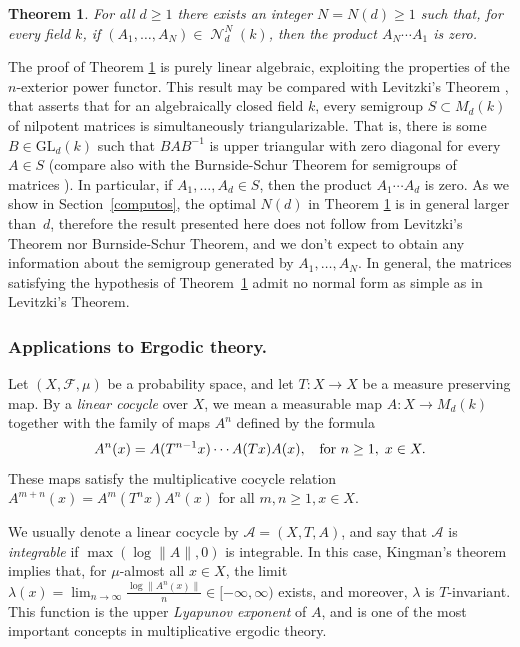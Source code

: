 \documentclass[JEP,XML,SOM,Unicode,NoEqCountersInSection]{cedram}
\let\mathcal\mathscr
\theoremstyle{plain}
\newtheorem{teo}{Theorem}[section]
\theoremstyle{definition}
\newcommand{\ccl}[3]{#1^{#2}(#3)}
\DeclareMathOperator{\Nil}{\mathcal{N}}
\begin{document}
\begin{teo}\label{nilpotentes} For all $d\geq 1$ there exists an integer $N=N(d)\geq 1$ such that, for every field $k$, if $(A_1,\dots,A_N) \in \Nil_{d}^{N}(k)$, then the product $A_{N}\cdots A_{1}$ is zero.
\end{teo}
The proof of Theorem \ref{nilpotentes} is purely linear algebraic, exploiting the properties of the $n$-exterior power functor. This result may be compared with Levitzki's Theorem \cite[Th.\,2.1.7]{raro}, that asserts that for an algebraically closed field $k$, every semigroup $S\subset M_{d}(k)$ of nilpotent matrices is simultaneously triangularizable. That is, there is some $B\in \mathrm{GL}_{d}(k)$ such that $BAB^{-1}$ is upper triangular with zero diagonal for every $A \in S$ (compare also with the Burnside-Schur Theorem for semigroups of matrices \cite{mcnaugh}). In particular, if $A_1,\dots,A_d\in S$, then the product $A_1 \cdots A_d$ is zero. As we show in Section~\ref{computos}, the optimal $N(d)$ in Theorem \ref{nilpotentes} is in general larger than~$d$, therefore the result presented here does not follow from Levitzki's Theorem nor Burnside-Schur Theorem, and we don't expect to obtain any information about the semigroup generated by $A_1,\dots,A_N$. In general, the matrices satisfying the hypothesis of Theorem~\ref{nilpotentes} admit no normal form as simple as in Levitzki's Theorem.

\subsubsection*{Applications to Ergodic theory.} Let $(X,\mathcal{F},\mu)$ be a probability space, and let $T:X\rightarrow X$ be a measure preserving map. By a \textit{linear cocycle} over $X$, we mean a measurable map $A:X\rightarrow M_{d}(k)$ together with the family of maps $A^{n}$ defined by the formula
\begin{equation*}
\ccl{A}{n}{x}=A(T^{n-1}x)\cdots A(Tx)A(x), \hspace{2mm} \text{ for }n\geq 1,\;x\in X.
\end{equation*}
These maps satisfy the multiplicative cocycle relation $A^{m+n}(x)=A^{m}(T^{n}x)A^{n}(x)$ for all $m,n\geq 1,x \in X$.

We usually denote a linear cocycle by $\mathcal{A}=(X,T,A)$, and say that $\mathcal{A}$ is \textit{integrable} if $\max(\log{\|A\|},0)$ is integrable. In this case, Kingman's theorem implies that, for $\mu$-almost all $x\in X$, the limit $\lambda(x)=\lim_{n \to \infty}{\frac{\log{\|\ccl{A}{n}{x}\|}}{n}}\in [-\infty,\infty)$ exists, and moreover, $\lambda$ is $T$-invariant. This function is the upper \textit{Lyapunov exponent} of $A$, and is one of the most important concepts in multiplicative ergodic theory.
\end{document}
